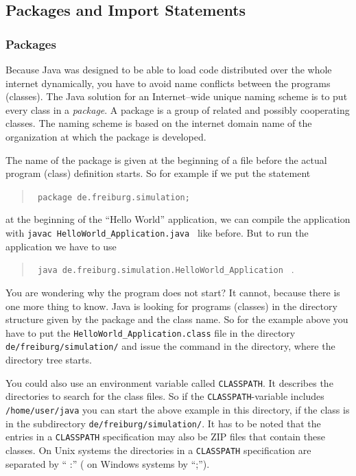 \subsection{Packages and Import Statements}
\subsubsection{Packages}
Because Java was designed to be able to load code distributed
over the whole internet dynamically, you have to avoid name conflicts
between the programs (classes). The Java solution 
for an Internet--wide unique naming scheme is to put
every class in a \emph{package}. A package  is a group of related
and possibly cooperating classes. The naming scheme is based on the
internet domain name of the organization at which the package is developed.

The name of the package is given
at the beginning of a file before the actual program (class)
definition starts. So for example if we put the statement
\begin{quotation}
  \verb/ package de.freiburg.simulation; / 
\end{quotation}
at the beginning of the ``Hello World'' application, we can compile
the application with \verb/javac HelloWorld_Application.java / like before.
But to run the application we have to use
\begin{quotation}
  \verb/ java de.freiburg.simulation.HelloWorld_Application / . 
\end{quotation}
You are wondering why the program does not start? It cannot, because
there is one more thing to know. Java is looking for programs (classes)
in the directory structure given by the package and the class name. So
for the example above you have to put the 
\verb/HelloWorld_Application.class/ file
in the directory \verb|de/freiburg/simulation/| and issue the command
in the directory, where the directory tree starts.

You could also use an environment variable called \verb|CLASSPATH|. It
describes the directories to search for the class files. So if the
\verb|CLASSPATH|-variable includes \verb|/home/user/java| you can
start the above example in this directory, if the class is in the 
subdirectory  \verb|de/freiburg/simulation/|. It has to be noted that
the entries in a \verb|CLASSPATH| specification may also be ZIP files
that contain these classes. On Unix systems the directories in a
\verb|CLASSPATH| specification are separated by `` :'' ( on Windows systems
by ``;'').



